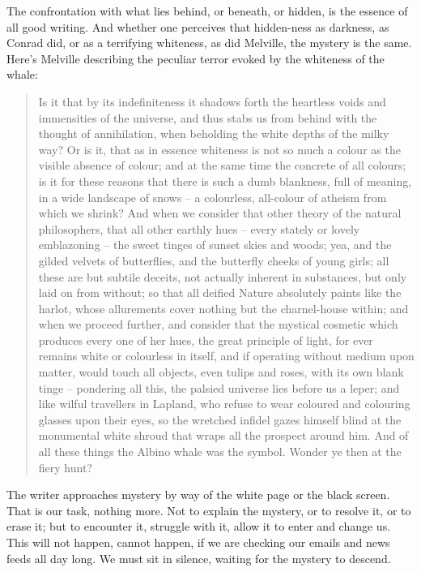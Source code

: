 \documentclass[10pt,DIV09,letterpaper,oneside,headsepline]{scrreprt}
\begin{document}
The confrontation with what lies behind, or beneath, or hidden, is the
essence of all good writing. And whether one perceives that
hidden-ness as darkness, as Conrad did, or as a terrifying whiteness,
as did Melville, the mystery is the same. Here's Melville describing
the peculiar terror evoked by the whiteness of the whale:
\begin{quotation}
Is it that by its indefiniteness it shadows forth the heartless
voids and immensities of the universe, and thus stabs us from behind
with the thought of annihilation, when beholding the white depths of
the milky way? Or is it, that as in essence whiteness is not so much
a colour as the visible absence of colour; and at the same time the
concrete of all colours; is it for these reasons that there is such
a dumb blankness, full of meaning, in a wide landscape of snows --
a colourless, all-colour of atheism from which we shrink? And when
we consider that other theory of the natural philosophers, that all
other earthly hues -- every stately or lovely emblazoning -- the
sweet tinges of sunset skies and woods; yea, and the gilded velvets
of butterflies, and the butterfly cheeks of young girls; all these
are but subtile deceits, not actually inherent in substances, but
only laid on from without; so that all deified Nature absolutely
paints like the harlot, whose allurements cover nothing but the
charnel-house within; and when we proceed further, and consider that
the mystical cosmetic which produces every one of her hues, the
great principle of light, for ever remains white or colourless in
itself, and if operating without medium upon matter, would touch all
objects, even tulips and roses, with its own blank tinge --
pondering all this, the palsied universe lies before us a leper; and
like wilful travellers in Lapland, who refuse to wear coloured and
colouring glasses upon their eyes, so the wretched infidel gazes
himself blind at the monumental white shroud that wraps all the
prospect around him. And of all these things the Albino whale was
the symbol. Wonder ye then at the fiery hunt?
\end{quotation}

The writer approaches mystery by way of the white page or the black
screen. That is our task, nothing more. Not to explain the mystery, or
to resolve it, or to erase it; but to encounter it, struggle with it,
allow it to enter and change us. This will not happen, cannot happen,
if we are checking our emails and news feeds all day long. We must sit
in silence, waiting for the mystery to descend.
\end{document}
